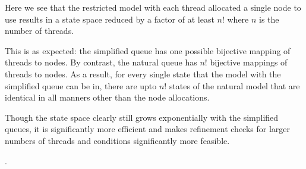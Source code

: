   Here we see that the restricted model with each thread allocated a single node to use results in a state space reduced by a factor of at least $n!$ where $n$ is the number of threads. 
  
  
  

  This is as expected: the simplified queue has one possible bijective mapping of threads to nodes. By contrast, the natural queue has $n!$ bijective mappings of threads to nodes. As a result, for every single state that the model with the simplified queue can be in, there are upto $n!$ states of the natural model that are identical in all manners other than the node allocations.

  Though the state space clearly still grows exponentially with the simplified queues, it is significantly more efficient and makes refinement checks for larger numbers of threads and conditions significantly more feasible.

  .





   


  